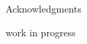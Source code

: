 

\thispagestyle{empty}

\vspace*{20mm}

\begin{center}
 Acknowledgments
\end{center}

\vspace{10mm}

work in progress


\cleardoublepage{}

